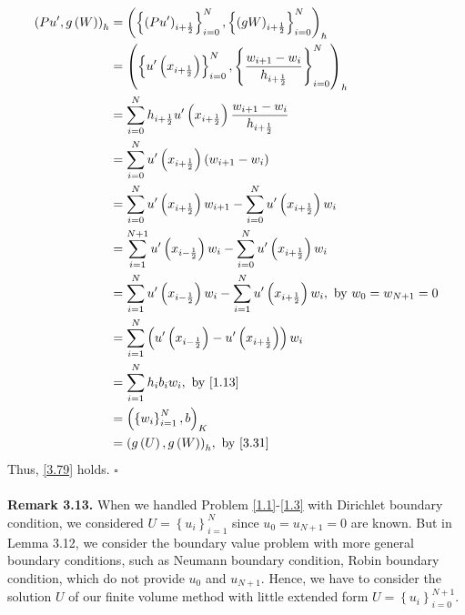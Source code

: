 \documentclass[a4paper]{article}
\numberwithin{equation}{section}
\begin{document}
\begin{align}
{\left( {Pu',g\left( W \right)} \right)_h} &= {\left( {\left\{ {{{\left( {Pu'} \right)}_{i + \frac{1}{2}}}} \right\}_{i = 0}^N,\left\{ {{{\left( {gW} \right)}_{i + \frac{1}{2}}}} \right\}_{i = 0}^N} \right)_h}\\
 &= {\left( {\left\{ {u'\left( {{x_{i + \frac{1}{2}}}} \right)} \right\}_{i = 0}^N,\left\{ {\frac{{{w_{i + 1}} - {w_i}}}{{{h_{i + \frac{1}{2}}}}}} \right\}_{i = 0}^N} \right)_h}\\
 &= \sum\limits_{i = 0}^N {{h_{i + \frac{1}{2}}}u'\left( {{x_{i + \frac{1}{2}}}} \right)\frac{{{w_{i + 1}} - {w_i}}}{{{h_{i + \frac{1}{2}}}}}} \\
 &= \sum\limits_{i = 0}^N {u'\left( {{x_{i + \frac{1}{2}}}} \right)\left( {{w_{i + 1}} - {w_i}} \right)} \\
 &= \sum\limits_{i = 0}^N {u'\left( {{x_{i + \frac{1}{2}}}} \right){w_{i + 1}}}  - \sum\limits_{i = 0}^N {u'\left( {{x_{i + \frac{1}{2}}}} \right){w_i}} \\
 &= \sum\limits_{i = 1}^{N + 1} {u'\left( {{x_{i - \frac{1}{2}}}} \right){w_i}}  - \sum\limits_{i = 0}^N {u'\left( {{x_{i + \frac{1}{2}}}} \right){w_i}} \\
 &= \sum\limits_{i = 1}^N {u'\left( {{x_{i - \frac{1}{2}}}} \right){w_i}}  - \sum\limits_{i = 1}^N {u'\left( {{x_{i + \frac{1}{2}}}} \right){w_i}} ,\mbox{ by } {w_0} = {w_{N + 1}} = 0\\
 &= \sum\limits_{i = 1}^N {\left( {u'\left( {{x_{i - \frac{1}{2}}}} \right) - u'\left( {{x_{i + \frac{1}{2}}}} \right)} \right){w_i}} \\
 &= \sum\limits_{i = 1}^N {{h_i}{b_i}{w_i}} ,\mbox{ by \eqref{1.13}}\\
 &= {\left( {\left\{ {{w_i}} \right\}_{i = 1}^N,b} \right)_K}\\
 &= {\left( {g\left( U \right),g\left( W \right)} \right)_h},\mbox{ by \eqref{3.31}}
\end{align}
Thus, \eqref{3.79} holds. \hfill $\square$\\
\\
\textbf{Remark 3.13.} When we handled Problem \eqref{1.1}-\eqref{1.3} with Dirichlet boundary condition, we considered $U = \left\{ {{u_i}} \right\}_{i = 1}^N$ since $u_0=u_{N+1}=0$ are known. But in Lemma 3.12, we consider the boundary value problem with more general boundary conditions, such as Neumann boundary condition, Robin boundary condition, which do not provide $u_0$ and $u_{N+1}$. Hence, we have to consider the solution $U$ of our finite volume method with little extended form $U= \left\{ {{u_i}} \right\}_{i = 0}^{N + 1}$.\\
\end{document}
